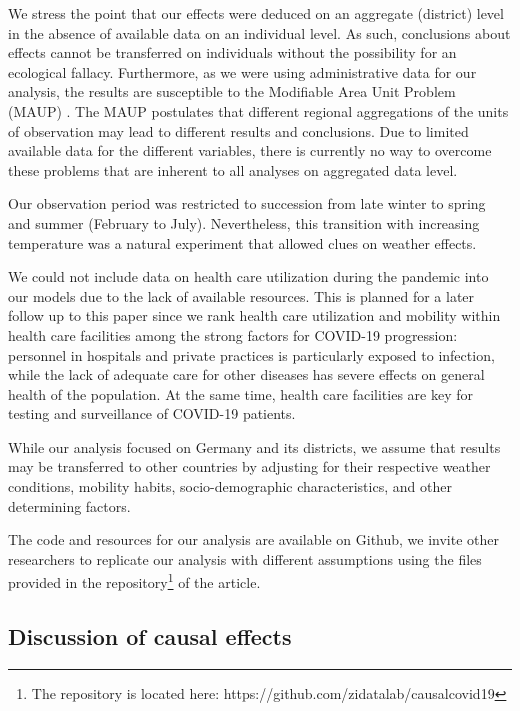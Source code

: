 \documentclass[]{elsarticle} %
\begin{document}
We stress the point that our effects were deduced on an aggregate (district) level in the absence of available data on an individual level. As such, conclusions about effects cannot be transferred on individuals without the possibility for an ecological fallacy. Furthermore, as we were using administrative data for our analysis, the results are susceptible to the Modifiable Area Unit Problem (MAUP) \citep{Openshaw1984}. The MAUP postulates that different regional aggregations of the units of observation may lead to different results and conclusions. Due to limited available data for the different variables, there is currently no way to overcome these problems that are inherent to all analyses on aggregated data level.

Our observation period was restricted to succession from late winter to spring and summer (February to July). Nevertheless, this transition with increasing temperature was a natural experiment that allowed clues on weather effects.

We could not include data on health care utilization during the pandemic into our models due to the lack of available resources. This is planned for a later follow up to this paper since we rank health care utilization and mobility within health care facilities among the strong factors for COVID-19 progression: personnel in hospitals and private practices is particularly exposed to infection, while the lack of adequate care for other diseases has severe effects on general health of the population. At the same time, health care facilities are key for testing and surveillance of COVID-19 patients.

While our analysis focused on Germany and its districts, we assume that results may be transferred to other countries by adjusting for their respective weather conditions, mobility habits, socio-demographic characteristics, and other determining factors.

The code and resources for our analysis are available on Github, we invite other researchers to replicate our analysis with different assumptions using the files provided in the repository\footnote{The repository is located here: https://github.com/zidatalab/causalcovid19} of the article.

\hypertarget{discussion-of-causal-effects}{%
\subsection{Discussion of causal effects}\label{discussion-of-causal-effects}}
\end{document}
